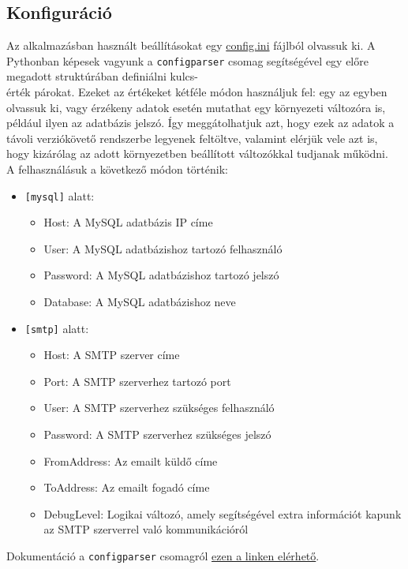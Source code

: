 \documentclass[11pt, a4paper]{article}
\begin{document}
		\subsection{Konfiguráció}
			\begin{flushleft}
				\justifying
				Az alkalmazásban használt beállításokat egy
				\color{blue} \href{https://github.com/mark182182/GKLB_INTM020_mikroelektromechanikai_rendszerek/blob/main/config.ini}{config.ini}
				\color{black}
				fájlból olvassuk ki. A Pythonban képesek vagyunk a \texttt{configparser} csomag segítségével egy előre megadott struktúrában definiálni kulcs-\\érték párokat. Ezeket az értékeket kétféle módon használjuk fel: egy az egyben olvassuk ki, vagy érzékeny adatok esetén mutathat egy környezeti változóra is, például ilyen az adatbázis jelszó. Így meggátolhatjuk azt, hogy ezek az adatok a távoli verziókövető rendszerbe legyenek feltöltve, valamint elérjük vele azt is, hogy kizárólag az adott környezetben beállított változókkal tudjanak működni.\\
				A felhasználásuk a következő módon történik:
				\begin{itemize}
					\item \texttt{[mysql]} alatt:
					\begin{itemize}
						\item Host: A MySQL adatbázis IP címe
						\item User: A MySQL adatbázishoz tartozó felhasználó
						\item Password: A MySQL adatbázishoz tartozó jelszó
						\item Database: A MySQL adatbázishoz neve
					\end{itemize}
					\item \texttt{[smtp]} alatt:
						\begin{itemize}
							\item Host: A SMTP szerver címe
							\item Port: A SMTP szerverhez tartozó port
							\item User: A SMTP szerverhez szükséges felhasználó
							\item Password: A SMTP szerverhez szükséges jelszó
							\item FromAddress: Az emailt küldő címe
							\item ToAddress: Az emailt fogadó címe
							\item DebugLevel: Logikai változó, amely segítségével extra információt kapunk az SMTP szerverrel való kommunikációról
						\end{itemize}
				\end{itemize}
				Dokumentáció a \texttt{configparser} csomagról
				\color{blue}
				\href{https://docs.python.org/3/library/configparser.html}{ezen a linken elérhető}\color{black}.
			\end{flushleft}
			
\end{document}
